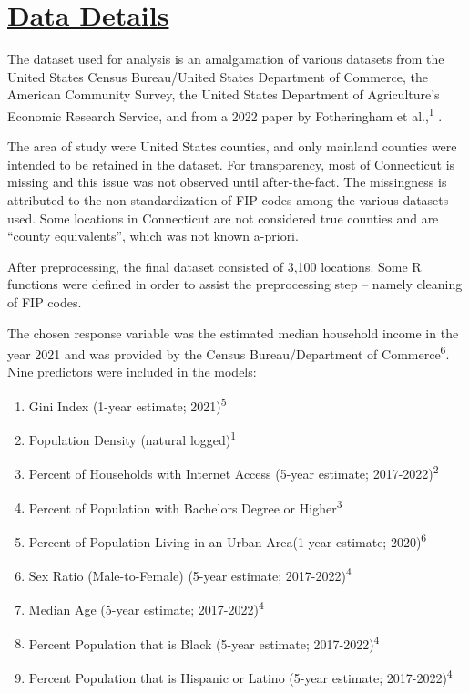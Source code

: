 \documentclass[
]{article}
\begin{document}
\section{\texorpdfstring{\ul{Data
Details}}{Data Details}}\label{data-details}

The dataset used for analysis is an amalgamation of various datasets
from the United States Census Bureau/United States Department of
Commerce, the American Community Survey, the United States Department of
Agriculture's Economic Research Service, and from a 2022 paper by
Fotheringham et al.,\textsuperscript{1} .

The area of study were United States counties, and only mainland
counties were intended to be retained in the dataset. For transparency,
most of Connecticut is missing and this issue was not observed until
after-the-fact. The missingness is attributed to the non-standardization
of FIP codes among the various datasets used. Some locations in
Connecticut are not considered true counties and are ``county
equivalents'', which was not known a-priori.

After preprocessing, the final dataset consisted of 3,100 locations.
Some R functions were defined in order to assist the preprocessing step
-- namely cleaning of FIP codes.

The chosen response variable was the estimated median household income
in the year 2021 and was provided by the Census Bureau/Department of
Commerce\textsuperscript{6}. Nine predictors were included in the
models:

\begin{enumerate}
\def\labelenumi{\arabic{enumi}.}
\item
  Gini Index (1-year estimate; 2021)\textsuperscript{5}
\item
  Population Density (natural logged)\textsuperscript{1}
\item
  Percent of Households with Internet Access (5-year estimate;
  2017-2022)\textsuperscript{2}
\item
  Percent of Population with Bachelors Degree or
  Higher\textsuperscript{3}
\item
  Percent of Population Living in an Urban Area(1-year estimate;
  2020)\textsuperscript{6}
\item
  Sex Ratio (Male-to-Female) (5-year estimate;
  2017-2022)\textsuperscript{4}
\item
  Median Age (5-year estimate; 2017-2022)\textsuperscript{4}
\item
  Percent Population that is Black (5-year estimate;
  2017-2022)\textsuperscript{4}
\item
  Percent Population that is Hispanic or Latino (5-year estimate;
  2017-2022)\textsuperscript{4}
\end{enumerate}
\end{document}
